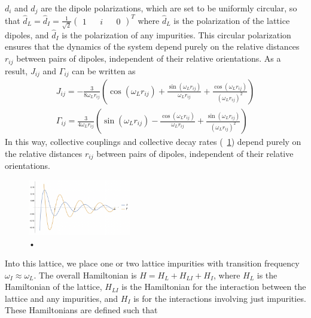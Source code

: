 \documentclass[aps,pra,superscriptaddress,twocolumn]{revtex4-1}
\newcommand{\fref}[1]{\text{Fig.}~\ref{#1}}
\newcommand{\commentSB}[1]{\texttt{\color{blue}[#1]}}
\begin{document}
$d_i$ and $d_j$ are the dipole polarizations, which are set to be uniformly circular, so that $ \hat{d}_L = \hat{d}_I = \frac{1}{\sqrt{2}} \begin{pmatrix} 
    1 && i && 0 
\end{pmatrix} ^T
\label{eqn:polarization} $
where $\hat{d}_L$ is the polarization of the lattice dipoles, and $\hat{d}_I$ is the polarization of any impurities. This circular polarization ensures that the dynamics of the system depend purely on the relative distances $r_{ij}$ between pairs of dipoles, independent of their relative orientations. As a result, $J_{ij}$ and $\Gamma_{ij}$ can be written as 
\begin{subequations}
    \begin{align}
    J_{ij} = -\frac{3}{8 \omega_L r_{ij}} \left( \cos (\omega_L r_{ij}) + \frac{\sin (\omega_L r_{ij})}{\omega_L r_{ij}} + \frac{\cos (\omega_L r_{ij})}{(\omega_L r_{ij})^2} \right) \\
    \Gamma_{ij} = \frac{3}{4\omega_L r_{ij}} \left( \sin(\omega_L r_{ij}) - \frac{\cos(\omega_L r_{ij})}{\omega_L r_{ij}} + \frac{\sin(\omega_L r_{ij})}{(\omega_L r_{ij})^2} \right) 
    \end{align}
\end{subequations}
In this way, collective couplings and collective decay rates (\fref{fig:J_and_Gamma_over_r}) depend purely on the relative distances $r_{ij}$ between pairs of dipoles, independent of their relative orientations. 
\begin{figure}
    \includegraphics[width=0.4\textwidth]{figures/J_and_Gamma.png} 
    \caption{•}
    \label{fig:J_and_Gamma_over_r}
\end{figure}
Into this lattice, we place one or two lattice impurities with transition frequency $\omega_I \approx \omega_L$. The overall Hamiltonian is $H = H_L + H_{LI} + H_{I}$, where $H_L$ is the Hamiltonian of the lattice, $H_{LI}$ is the Hamiltonian for the interaction between the lattice and any impurities, and $H_{I}$ is for the interactions involving just impurities. These Hamiltonians are defined such that  
\end{document}
